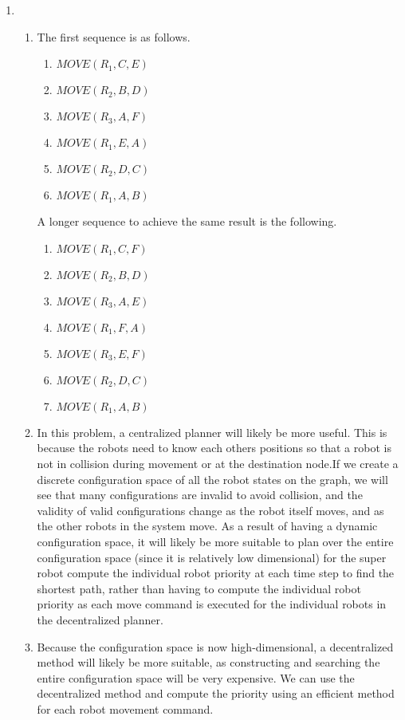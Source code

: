 \documentclass[11pt]{article}
\begin{document}
\begin{enumerate}[leftmargin=0.3in]
   \item %
   \begin{enumerate}
       \item The first sequence is as follows.
           \begin{enumerate}
               \item $MOVE(R_1, C, E)$
               \item $MOVE(R_2, B, D)$
               \item $MOVE(R_3, A, F)$
               \item $MOVE(R_1, E, A)$
               \item $MOVE(R_2, D, C)$
               \item $MOVE(R_1, A, B)$
           \end{enumerate}
           A longer sequence to achieve the same result is the following.
           \begin{enumerate}
               \item $MOVE(R_1, C, F)$
               \item $MOVE(R_2, B, D)$
               \item $MOVE(R_3, A, E)$
               \item $MOVE(R_1, F, A)$
               \item $MOVE(R_3, E, F)$
               \item $MOVE(R_2, D, C)$
               \item $MOVE(R_1, A, B)$
           \end{enumerate}
       \item  In this problem, a centralized planner will likely be more useful. This is because the robots need to know each others positions so that a robot is not in collision during movement or at the destination node.If we create a discrete configuration space of all the robot states on the graph, we will see that many configurations are invalid to avoid collision, and the validity of valid configurations change as the robot itself moves, and as the other robots in the system move. As a result of having a dynamic configuration space, it will likely be more suitable to plan over the entire configuration space (since it is relatively low dimensional) for the super robot compute the individual robot priority at each time step to find the shortest path, rather than having to compute the individual robot priority as each move command is executed for the individual robots in the decentralized planner.
       \item  Because the configuration space is now high-dimensional, a decentralized method will likely be more suitable, as constructing and searching the entire configuration space will be very expensive. We can use the decentralized method and compute the priority using an efficient method for each robot movement command.


\end{enumerate}
\end{enumerate}
\end{document}
